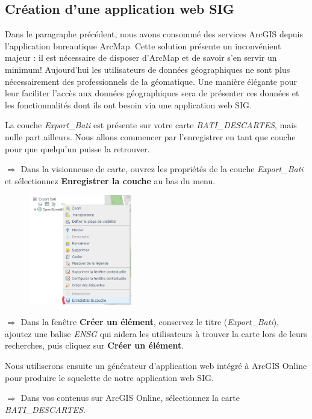 \documentclass[11pt]{article}
\newcommand{\action}{$\Rightarrow$ }
\begin{document}
\subsection{Création d'une application web SIG}
Dans le paragraphe précédent, nous avons consommé des services ArcGIS depuis l'application bureautique ArcMap. Cette solution présente un inconvénient majeur : il est nécessaire de disposer d'ArcMap et de savoir s'en servir un minimum! Aujourd'hui les utilisateurs de données géographiques ne sont plus nécessairement des professionnels de la géomatique. Une manière élégante pour leur faciliter l'accès aux données géographiques sera de présenter ces données et les fonctionnalités dont ils ont besoin via une application web SIG.

La couche \textit{Export\_Bati} est présente sur votre carte \textit{BATI\_DESCARTES}, mais nulle part ailleurs. Nous allons commencer par l'enregistrer en tant que couche pour que quelqu'un puisse la retrouver.

\action Dans la visionneuse de carte, ouvrez les propriétés de la couche \textit{Export\_Bati} et sélectionnez \textbf{Enregistrer la couche} au bas du menu.
\begin{figure}[H]
	\center \includegraphics[width=0.4\textwidth]{img/cours3/ago_enregistrer_couche.png} \\
\end{figure}

\action Dans la fenêtre \textbf{Créer un élément}, conservez le titre (\textit{Export\_Bati}), ajoutez une balise \textit{ENSG} qui aidera les utilisateurs à trouver la carte lors de leurs recherches, puis cliquez sur \textbf{Créer un élément}.

Nous utiliserons ensuite un générateur d'application web intégré à ArcGIS Online pour produire le squelette de notre application web SIG.

\action Dans vos contenus sur ArcGIS Online, sélectionnez la carte \textit{BATI\_DESCARTES}.
\end{document}
